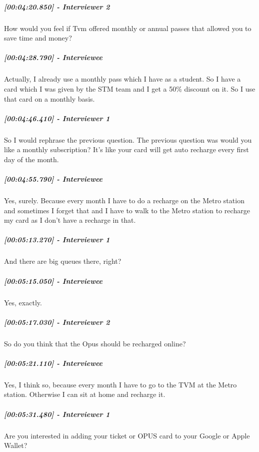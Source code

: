 \documentclass[a4paper,12pt]{article}
\begin{document}
\hypertarget{interviewer-2-12}{%
\subparagraph{{[}00:04:20.850{]} - Interviewer
2}\label{interviewer-2-12}}

How would you feel if Tvm offered monthly or annual passes that allowed
you to save time and money?

\hypertarget{interviewee-22}{%
\subparagraph{{[}00:04:28.790{]} - Interviewee}\label{interviewee-22}}

Actually, I already use a monthly pass which I have as a student. So I
have a card which I was given by the STM team and I get a 50\% discount
on it. So I use that card on a monthly basis.

\hypertarget{interviewer-1-12}{%
\subparagraph{{[}00:04:46.410{]} - Interviewer
1}\label{interviewer-1-12}}

So I would rephrase the previous question. The previous question was
would you like a monthly subscription? It's like your card will get auto
recharge every first day of the month.

\hypertarget{interviewee-23}{%
\subparagraph{{[}00:04:55.790{]} - Interviewee}\label{interviewee-23}}

Yes, surely. Because every month I have to do a recharge on the Metro
station and sometimes I forget that and I have to walk to the Metro
station to recharge my card as I don't have a recharge in that.

\hypertarget{interviewer-1-13}{%
\subparagraph{{[}00:05:13.270{]} - Interviewer
1}\label{interviewer-1-13}}

And there are big queues there, right?

\hypertarget{interviewee-24}{%
\subparagraph{{[}00:05:15.050{]} - Interviewee}\label{interviewee-24}}

Yes, exactly.

\hypertarget{interviewer-2-13}{%
\subparagraph{{[}00:05:17.030{]} - Interviewer
2}\label{interviewer-2-13}}

So do you think that the Opus should be recharged online?

\hypertarget{interviewee-25}{%
\subparagraph{{[}00:05:21.110{]} - Interviewee}\label{interviewee-25}}

Yes, I think so, because every month I have to go to the TVM at the
Metro station. Otherwise I can sit at home and recharge it.

\hypertarget{interviewer-1-14}{%
\subparagraph{{[}00:05:31.480{]} - Interviewer
1}\label{interviewer-1-14}}

Are you interested in adding your ticket or OPUS card to your Google or
Apple Wallet?
\end{document}
